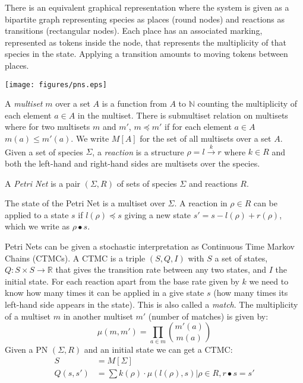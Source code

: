 There is an equivalent graphical representation where the system is given as a
bipartite graph representing species as places (round nodes) and reactions as
transitions (rectangular nodes). Each place has an associated marking,
represented as tokens inside the node, that represents the multiplicity of that
species in the state. Applying a transition amounts to moving tokens between
places.

\begin{center}
    \texttt{[image: figures/pns.eps]}
\end{center}

A \emph{multiset} $m$ over a set $A$ is a function from $A$ to $\mathbb{N}$ counting
the multiplicity of each element $a \in A$ in the multiset. There is submultiset
relation on multisets where for two multisets $m$ and $m'$, $m \preceq m'$ if for each
element $a \in A$ $m(a) \leq m'(a)$. We write $M[A]$ for the set of all multisets
over a set $A$. Given a set of species $\Sigma$, a \emph{reaction} is a structure $\rho
= l \xrightarrow{k} r$ where $k \in R$ and both the left-hand and right-hand
sides are multisets over the species. 

\begin{definition}
A \emph{Petri Net} is a pair $(\Sigma, R)$ of sets of species $\Sigma$ and reactions $R$.
\end{definition}

The state of the Petri Net is a multiset over $\Sigma$. A reaction in $\rho \in R$ can be
applied to a state $s$ if $l(\rho) \preceq s$ giving a new state $s' = s -
l(\rho) + r(\rho)$, which we write as $\rho \bullet s$.

Petri Nets can be given a stochastic interpretation as Continuous Time Markov
Chains (CTMCs). A CTMC is a triple $(S, Q, I)$ with $S$ a set of states,
$Q: S \times S \rightarrow \mathbb{R}$ that gives the transition rate between
any two states, and $I$ the initial state. For each reaction apart from the base
rate given by $k$ we need to know how many times it can be applied in a give
state $s$ (\ie how many times its left-hand side appears in the state). This is
also called a \emph{match}. The multiplicity of a multiset $m$ in another
multiset $m'$ (number of matches) is given by:
$$
\mu(m, m') = \prod_{a \in m}  \binom{m'(a)}{m(a)}
$$
Given a PN $(\Sigma, R)$ and an initial state we can get a CTMC:
\begin{align*}
  S & = M[\Sigma] \\
  Q(s, s') &= \sum {k(\rho) \cdot \mu(l(\rho), s) | \rho \in R, r \bullet s = s'}
\end{align*}

